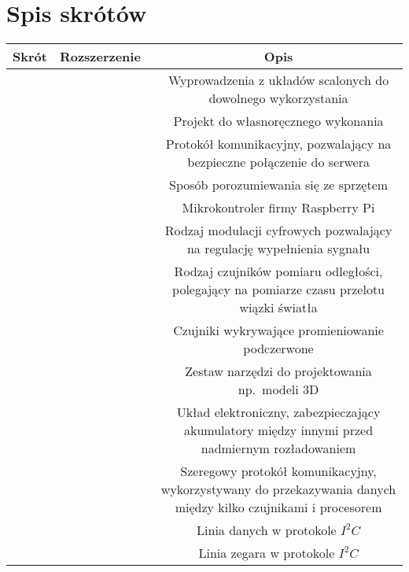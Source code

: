 \section*{Spis skrótów}
\begin{table*}[!ht]
    \begin{tabularx}{\textwidth}{|c|C|C|}\hline
        Skrót & Rozszerzenie\ & Opis\\\hline
               &  & Wyprowadzenia z układów scalonych do dowolnego wykorzystania\\\hline
                &  & Projekt do własnoręcznego wykonania\\\hline
                &  & Protokół komunikacyjny, pozwalający na bezpieczne połączenie do serwera\\\hline
                &  & Sposób porozumiewania się ze sprzętem\\\hline
         &  & Mikrokontroler firmy Raspberry Pi\\\hline
                &  & Rodzaj modulacji cyfrowych pozwalający na regulację wypełnienia sygnału\\\hline
                &  & Rodzaj czujników pomiaru odległości, polegający na pomiarze czasu przelotu wiązki światła\\\hline
                 &  & Czujniki wykrywające promieniowanie podczerwone\\\hline
                &  & Zestaw narzędzi do projektowania np.~modeli 3D\\\hline
                &  & Układ elektroniczny, zabezpieczający akumulatory między innymi przed nadmiernym rozładowaniem\\\hline
             &  & Szeregowy protokół komunikacyjny, wykorzystywany do przekazywania danych między kilko czujnikami i procesorem\\\hline
              &  & Linia danych w protokole $I^2C$\\\hline
              &  & Linia zegara w protokole $I^2C$\\\hline
    \end{tabularx}
\end{table*}